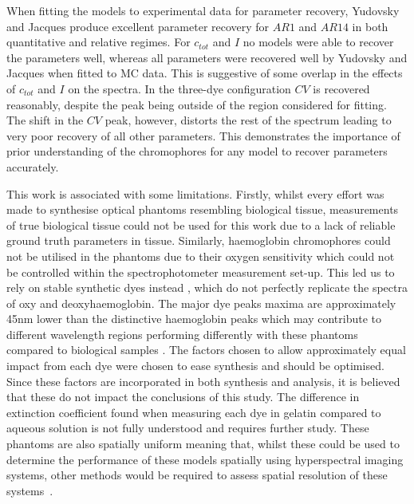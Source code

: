 When fitting the models to experimental data for parameter recovery, Yudovsky and Jacques produce excellent parameter recovery for $AR1$ and $AR14$ in both quantitative and relative regimes. For $c_{tot}$ and $I$ no models were able to recover the parameters well, whereas all parameters were recovered well by Yudovsky and Jacques when fitted to MC data. This is suggestive of some overlap in the effects of $c_{tot}$ and $I$ on the spectra. In the three-dye configuration $CV$ is recovered reasonably, despite the peak being outside of the region considered for fitting. The shift in the $CV$ peak, however, distorts the rest of the spectrum leading to very poor recovery of all other parameters. This demonstrates the importance of prior understanding of the chromophores for any model to recover parameters accurately. 

This work is associated with some limitations.
Firstly, whilst every effort was made to synthesise optical phantoms resembling biological tissue, measurements of true biological tissue could not be used for this work due to a lack of reliable ground truth parameters in tissue. %
Similarly, haemoglobin chromophores could not be utilised in the phantoms due to their oxygen sensitivity which could not be controlled within the spectrophotometer measurement set-up. This led us to rely on stable synthetic dyes instead
, which do not perfectly replicate the spectra of oxy and deoxyhaemoglobin. The major dye peaks maxima are approximately 45nm lower than the distinctive haemoglobin peaks which may contribute to different wavelength regions performing differently with these phantoms compared to biological samples
. 
The factors chosen to allow approximately equal impact from each dye were chosen to ease synthesis and should be optimised. Since these factors are incorporated in both synthesis and analysis, it is believed that these do not impact the conclusions of this study.
The difference in extinction coefficient found when measuring each dye in gelatin compared to aqueous solution is not fully understood and requires further study.
These phantoms are also spatially uniform meaning that, whilst these could be used to determine the performance of these models spatially using hyperspectral imaging systems, other methods would be required to assess spatial resolution of these systems~\citep{EdmundOptics2023, Torkildsen2018}.
